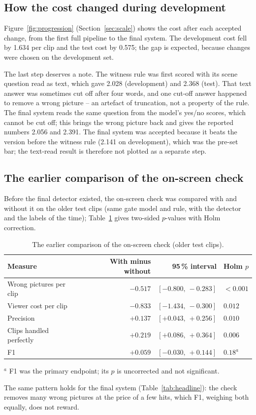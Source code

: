 \subsection{How the cost changed during development}\label{app:progression}
Figure~\ref{fig:progression} (Section~\ref{sec:scale}) shows the cost after each accepted change, from the first full
pipeline to the final system. The development cost fell by 1.634 per clip and the test cost by 0.575;
the gap is expected, because changes were chosen on the development set.

The last step deserves a note. The witness rule was first scored with its scene question read as text, which gave 2.028
(development) and 2.368 (test). That text answer was sometimes cut off after four words, and one cut-off answer happened
to remove a wrong picture -- an artefact of truncation, not a property of the rule. The final system reads the same question from
the model's yes/no scores, which cannot be cut off; this brings the wrong picture back and gives the reported numbers 2.056
and 2.391. The final system was accepted because it beats the version before the witness rule (2.141 on development),
which was the pre-set bar; the text-read result is therefore not plotted as a separate step.

\FloatBarrier
\subsection{The earlier comparison of the on-screen check}\label{sec:sept-table}
Before the final detector existed, the on-screen check was compared with and without it on the older test clips
(same gate model and rule, with the detector and the labels of the time); Table~\ref{tab:septgate} gives
two-sided $p$-values with Holm correction.
\begin{table}[tbp]\centering\small
\caption{The earlier comparison of the on-screen check (older test clips).}\label{tab:septgate}
\begin{tabular}{lrrl}
\toprule
Measure & With minus without & 95\,\% interval & Holm $p$ \\
\midrule
Wrong pictures per clip & $-0.517$ & $[-0.800,\ -0.283]$ & $<0.001$ \\
Viewer cost per clip & $-0.833$ & $[-1.434,\ -0.300]$ & $0.012$ \\
Precision & $+0.137$ & $[+0.043,\ +0.256]$ & $0.010$ \\
Clips handled perfectly & $+0.219$ & $[+0.086,\ +0.364]$ & $0.006$ \\
F1 & $+0.059$ & $[-0.030,\ +0.144]$ & $0.18^{a}$ \\
\bottomrule
\end{tabular}

\smallskip
\footnotesize $^{a}$ F1 was the primary endpoint; its $p$ is uncorrected and not significant.
\end{table}
The same pattern holds for the final system (Table~\ref{tab:headline}): the check removes many wrong pictures at the
price of a few hits, which F1, weighing both equally, does not reward.

